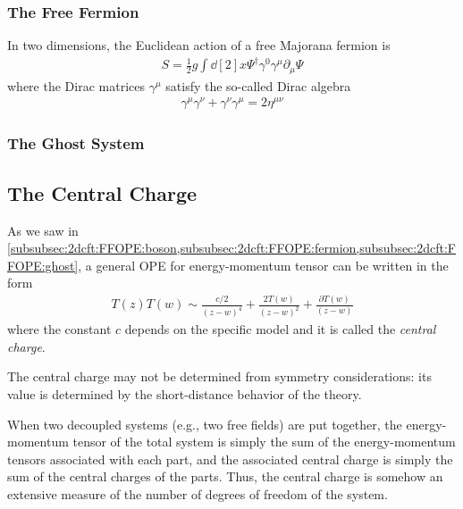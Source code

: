 \documentclass[10pt]{article}
\begin{document}
\subsubsection{The Free Fermion\label{subsubsec:2dcft:FFOPE:fermion}}
In two dimensions, the Euclidean action of a free Majorana fermion is
\begin{align}
    S=\frac{1}{2}g\int\dd[2]{x}\Psi^\dagger\gamma^0\gamma^\mu\partial_\mu\Psi
\end{align}
where the Dirac matrices $\gamma^\mu$ satisfy the so-called Dirac algebra
\begin{align}
    \gamma^\mu\gamma^\nu+\gamma^\nu\gamma^\mu=2\eta^{\mu\nu}
\end{align}
\subsubsection{The Ghost System\label{subsubsec:2dcft:FFOPE:ghost}}
\subsection{The Central Charge}
As we saw in \cref{subsubsec:2dcft:FFOPE:boson,subsubsec:2dcft:FFOPE:fermion,subsubsec:2dcft:FFOPE:ghost}, a general OPE for energy-momentum tensor can be written in the form
\begin{align}
    T(z)T(w)\sim\frac{c/2}{(z-w)^4}+\frac{2T(w)}{(z-w)^2}+\frac{\partial T(w)}{(z-w)}
\end{align}
where the constant $c$ depends on the specific model and it is called the \textit{central charge}.
\begin{remark}
    The central charge may not be determined from symmetry considerations: its value is determined by the short-distance behavior of the theory.
    
    When two decoupled systems (e.g., two free fields) are put together, the energy-momentum tensor of the total system is simply the sum of the energy-momentum tensors associated with each part, and the associated central charge is simply the sum of the central charges of the parts.
    Thus, the central charge is somehow an extensive measure of the number of degrees of freedom of the system.
\end{remark}
\end{document}
